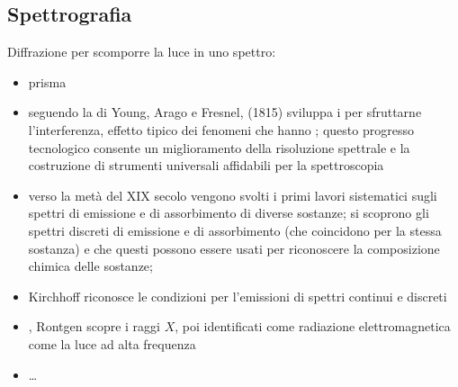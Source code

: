 \documentclass[letterpaper,10pt,italian]{jupyterBook}
\begin{document}
\subsection{Spettrografia}
\label{\detokenize{ch/electromagnetism/em-waves:spettrografia}}\label{\detokenize{ch/electromagnetism/em-waves:physics-hs-electromagnetism-em-waves-spectrography}}
\sphinxAtStartPar
Diffrazione per scomporre la luce in uno spettro:
\begin{itemize}
\item {} 
\sphinxAtStartPar
prisma

\item {} 
\sphinxAtStartPar
seguendo la  di Young, Arago e Fresnel,  (1815) sviluppa i  {\hyperref[\detokenize{ch/waves/intro:physics-hs-waves-effects-diffraction}]{}} per sfruttarne l’interferenza, effetto tipico dei fenomeni che hanno ; questo progresso tecnologico consente un miglioramento della risoluzione spettrale e la costruzione di strumenti universali affidabili per la spettroscopia

\item {} 
\sphinxAtStartPar
verso la metà del XIX secolo vengono svolti i primi lavori sistematici sugli spettri di emissione e di assorbimento di diverse sostanze; si scoprono gli spettri discreti di emissione e di assorbimento (che coincidono per la stessa sostanza) e che questi possono essere usati per riconoscere la composizione chimica delle sostanze;

\item {} 
\sphinxAtStartPar
Kirchhoff riconosce le condizioni per l’emissioni di spettri continui e discreti

\item {} 
, Rontgen scopre i raggi \(X\), poi identificati come radiazione elettromagnetica \sphinxhyphen{} come la luce \sphinxhyphen{} ad alta frequenza

\item {} 
\sphinxAtStartPar
…

\end{itemize}

\sphinxAtStartPar
{}  
\end{document}
